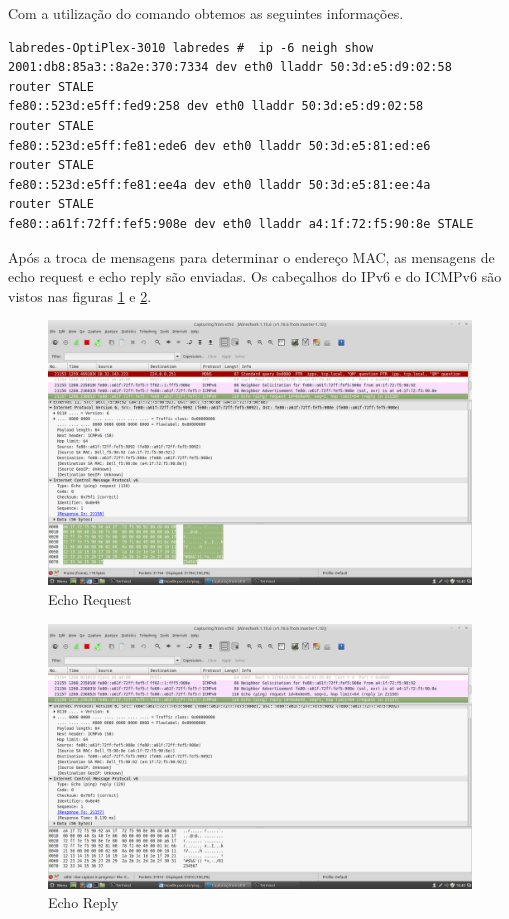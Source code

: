 \documentclass[12pt]{article}
\begin{document}
Com a utilização do comando obtemos as seguintes informações.
\begin{verbatim}
labredes-OptiPlex-3010 labredes #  ip -6 neigh show 
2001:db8:85a3::8a2e:370:7334 dev eth0 lladdr 50:3d:e5:d9:02:58 
router STALE
fe80::523d:e5ff:fed9:258 dev eth0 lladdr 50:3d:e5:d9:02:58 
router STALE
fe80::523d:e5ff:fe81:ede6 dev eth0 lladdr 50:3d:e5:81:ed:e6 
router STALE
fe80::523d:e5ff:fe81:ee4a dev eth0 lladdr 50:3d:e5:81:ee:4a 
router STALE
fe80::a61f:72ff:fef5:908e dev eth0 lladdr a4:1f:72:f5:90:8e STALE
\end{verbatim}

Após a troca de mensagens para determinar o endereço MAC, as mensagens de echo request e echo reply são enviadas. Os cabeçalhos do IPv6 e do ICMPv6 são vistos nas figuras \ref{1request} e \ref{1reply}. 
\begin{figure}[ht]
\centering
\includegraphics[scale=0.25]{request.png}
\caption{Echo Request}
\label{1request}
\end{figure}

\newpage{}
\begin{figure}[ht]
\centering
\includegraphics[scale=0.25]{reply.png}
\caption{Echo Reply}
\label{1reply}
\end{figure}
\end{document}
